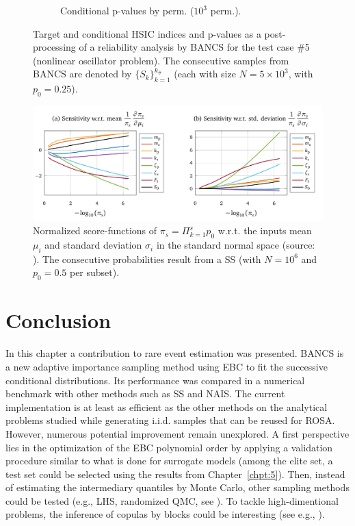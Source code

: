 \begin{figure}
\begin{subfigure}[b]{0.48\linewidth}
        \caption{Conditional p-values by perm. ($10^3$ perm.).}
    \end{subfigure}
    \caption{Target and conditional HSIC indices and p-values as a post-processing of a reliability analysis by BANCS for the test case \#5 (nonlinear oscillator problem). 
    The consecutive samples from BANCS are denoted by $\{S_k\}_{k=1}^{k_\#}$ (each with size $N=5\times10^3$, with $p_0=0.25$).}
    \label{fig:rosa_oscillator}
\end{figure}


\begin{figure}
    \centering
    \includegraphics[width=0.9\linewidth]{part3/figures/BANCS/score_function_HDR_JMB.png}
    \caption{Normalized score-functions of $\pi_s = \Pi_{k=1}^s p_0$ w.r.t. the inputs mean $\mu_i$ and standard deviation $\sigma_i$ in the standard normal space (source: \citealp[p.54]{bourinet_2018}). 
            The consecutive probabilities result from a SS (with $N=10^6$ and $p_0=0.5$ per subset).}
    \label{fig:score_functions_oscillator}
\end{figure}



\section{Conclusion}

In this chapter a contribution to rare event estimation was presented. 
BANCS is a new adaptive importance sampling method using EBC to fit the successive conditional distributions. 
Its performance was compared in a numerical benchmark with other methods such as SS and NAIS. 
The current implementation is at least as efficient as the other methods on the analytical problems studied while generating i.i.d. samples that can be reused for ROSA. 
However, numerous potential improvement remain unexplored. 
A first perspective lies in the optimization of the EBC polynomial order by applying a validation procedure similar to what is done for surrogate models (among the elite set, a test set could be selected using the results from Chapter~\ref{chpt:5}). 
Then, instead of estimating the intermediary quantiles by Monte Carlo, other sampling methods could be tested (e.g., LHS, randomized QMC, see \citealp{tuffin_2019}). 
To tackle high-dimentional problems, the inference of copulas by blocks could be interesting (see e.g., \citealp{lasserre_2022}).


